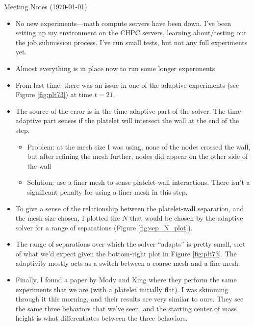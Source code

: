 \documentclass{article}
\begin{document}
\pagestyle{plain}

\begin{center}
  {\Large Meeting Notes (\today)}
\end{center}

\begin{itemize}
\item No new experiments---math compute servers have been down. I've
  been setting up my environment on the CHPC servers, learning
  about/testing out the job submission process. I've run small tests,
  but not any full experiments yet.
\item Almost everything is in place now to run some longer experiments
\item From last time, there was an issue in one of the adaptive
  experiments (see Figure \ref{fig:plt73}) at time $t=21$.
\item The source of the error is in the time-adaptive part of the
  solver. The time-adaptive part senses if the platelet will intersect
  the wall at the end of the step.
  \begin{itemize}
  \item Problem: at the mesh size I was using, none of the nodes
    crossed the wall, but after refining the mesh further, nodes did
    appear on the other side of the wall
  \item Solution: use a finer mesh to sense platelet-wall
    interactions. There isn't a significant penalty for using a finer
    mesh in this step.
  \end{itemize}
\item To give a sense of the relationship between the platelet-wall
  separation, and the mesh size chosen, I plotted the $N$ that would
  be chosen by the adaptive solver for a range of separations (Figure
  \ref{fig:sep_N_plot}).
\item The range of separations over which the solver ``adapts'' is
  pretty small, sort of what we'd expect given the bottom-right plot
  in Figure \ref{fig:plt73}. The adaptivity mostly acts as a switch
  between a coarse mesh and a fine mesh.
\item Finally, I found a paper by Mody and King where they perform the
  same experiments that we are (with a platelet initially flat). I was
  skimming through it this morning, and their results are very similar
  to ours. They see the same three behaviors that we've seen, and the
  starting center of mass height is what differentiates between the
  three behaviors.
\end{itemize}
\end{document}
